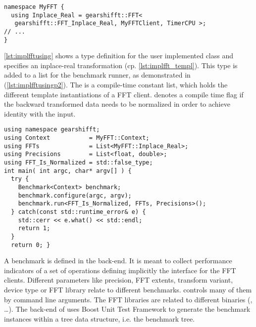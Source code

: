 \begin{lstlisting}[caption={Define FFT client types for corresponding FFTs},label={lst:implfftusing}]
namespace MyFFT { 
  using Inplace_Real = gearshifft::FFT<
   gearshifft::FFT_Inplace_Real, MyFFTClient, TimerCPU >;
// ...
}
\end{lstlisting}

\cref{lst:implfftusing} shows a type definition for the user implemented class  and specifies an inplace-real transformation (cp. \cref{lst:implfft_templ}).
This type is added to a list for the benchmark runner, as demonstrated in  (\cref{lst:implfftusingp2}). The  is a compile-time constant list, which holds the different template instantiations of a FFT client.  denotes a compile time flag if the backward transformed data needs to be normalized in order to achieve identity with the input.

\begin{lstlisting}[caption={Using FFT client types to run the benchmarks},label={lst:implfftusingp2}]
using namespace gearshifft;
using Context           = MyFFT::Context;         
using FFTs              = List<MyFFT::Inplace_Real>;
using Precisions        = List<float, double>;   
using FFT_Is_Normalized = std::false_type;
int main( int argc, char* argv[] ) {                                                        
  try {                                                  
    Benchmark<Context> benchmark;
    benchmark.configure(argc, argv);                     
    benchmark.run<FFT_Is_Normalized, FFTs, Precisions>();
  } catch(const std::runtime_error& e) {
    std::cerr << e.what() << std::endl;                  
    return 1;                                            
  }                                                      
  return 0; }                                                        
\end{lstlisting}

A \gearshifft{} benchmark is defined in the back-end. It is meant to collect performance indicators of a set of operations defining implicitly the interface for the FFT clients. Different parameters like precision, FFT extents, transform variant, device type or FFT library relate to different benchmarks.
\gearshifft{} controls many of them by command line arguments. The FFT libraries are related to different \gearshifft{} binaries (, \ldots).
The back-end of \gearshifft{} uses Boost Unit Test Framework to generate the benchmark instances within a tree data structure, i.e. the benchmark tree.

